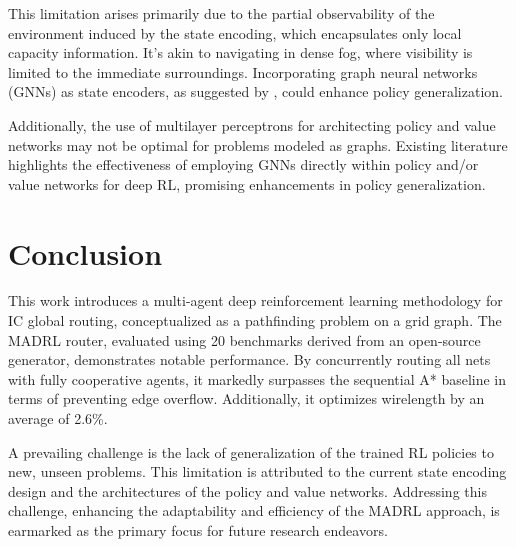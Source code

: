 \documentclass[conference]{IEEEtran}
\begin{document}
This limitation arises primarily due to the partial observability of the environment induced by the state encoding, which encapsulates only local capacity information. It’s akin to navigating in dense fog, where visibility is limited to the immediate surroundings. Incorporating graph neural networks (GNNs) as state encoders, as suggested by \cite{Mirhoseini2021}, could enhance policy generalization.

Additionally, the use of multilayer perceptrons for architecting policy and value networks may not be optimal for problems modeled as graphs. Existing literature \cite{Almasan2022,Wang2018} highlights the effectiveness of employing GNNs directly within policy and/or value networks for deep RL, promising enhancements in policy generalization.


\section{Conclusion}
This work introduces a multi-agent deep reinforcement learning methodology for IC global routing, conceptualized as a pathfinding problem on a grid graph. The MADRL router, evaluated using 20 benchmarks derived from an open-source generator, demonstrates notable performance. By concurrently routing all nets with fully cooperative agents, it markedly surpasses the sequential A* baseline in terms of preventing edge overflow. Additionally, it optimizes wirelength by an average of 2.6\%.

A prevailing challenge is the lack of generalization of the trained RL policies to new, unseen problems. This limitation is attributed to the current state encoding design and the architectures of the policy and value networks. Addressing this challenge, enhancing the adaptability and efficiency of the MADRL approach, is earmarked as the primary focus for future research endeavors.




\end{document}
